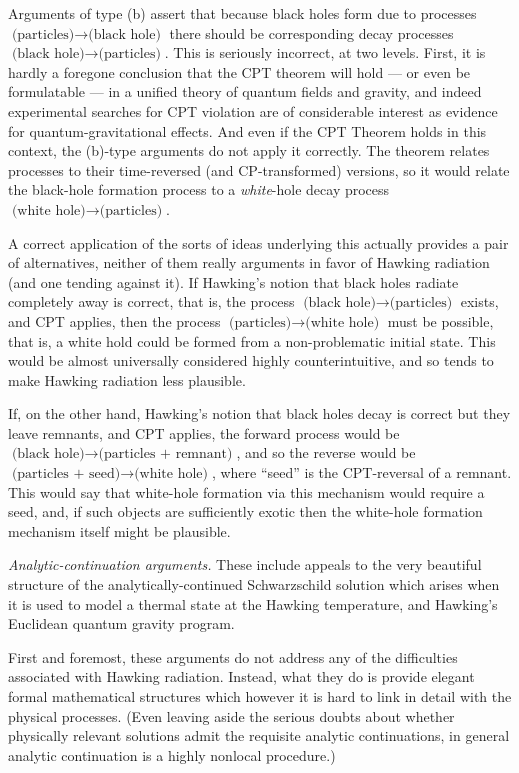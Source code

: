 \documentclass[
%
draft    %
,numberedheadings 
,bibliocites
  ]
  {aipproc}
\begin{document}
Arguments of type (b) assert that because black holes form due to processes $\mbox{(particles)}\to\mbox{(black hole)}$ there should be corresponding decay processes $\mbox{(black hole)}\to\mbox{(particles)}$.  This is seriously incorrect, at two levels. 
First, it is hardly a foregone conclusion that the CPT theorem will hold --- or even be formulatable --- in a unified theory of quantum fields and gravity, and indeed experimental searches for CPT violation are of considerable interest as evidence for quantum-gravitational effects. 
And even if the CPT Theorem holds in this context, the (b)-type arguments do not apply it correctly.
The theorem relates processes to their time-reversed (and CP-transformed) versions, so it would relate the black-hole formation process to a {\em white}-hole decay process $\mbox{(white hole)}\to\mbox{(particles)}$.

A correct application of the sorts of ideas underlying this actually provides a pair of alternatives, neither of them really arguments in favor of Hawking radiation (and one tending against it).
If Hawking's notion that black holes radiate completely away is correct, that is,
the process $\mbox{(black hole)}\to\mbox{(particles)}$ exists, and CPT applies, then the process $\mbox{(particles)}\to\mbox{(white hole)}$ must be possible, that is, a white hold could
be formed from a non-problematic initial state.
This would be almost universally considered highly counterintuitive, and so tends to make Hawking radiation less plausible. 

If, on the other hand, Hawking's notion that black holes decay is correct but they leave remnants,
and CPT applies,
the forward process would be  $\mbox{(black hole)}\to\mbox{(particles + remnant)}$, and so the reverse would be $\mbox{(particles + seed)}\to\mbox{(white hole)}$, where ``seed'' is the CPT-reversal of a remnant.  This would say that white-hole formation via this mechanism would require a seed, and, if such objects are sufficiently exotic then the white-hole formation mechanism itself might be plausible.




{\em Analytic-continuation arguments.}  These include appeals to the very beautiful structure of the analytically-continued Schwarzschild solution which arises when it is used to model a thermal state at the Hawking temperature, and Hawking's Euclidean quantum gravity program. 


First and foremost, these arguments do not address any of the difficulties associated with Hawking radiation.  Instead, what they do is provide elegant formal mathematical structures which however it is hard to link in detail with the physical processes.  (Even leaving aside the serious doubts about whether physically relevant solutions admit the requisite analytic continuations, in general analytic continuation is a highly nonlocal procedure.)
\end{document}
